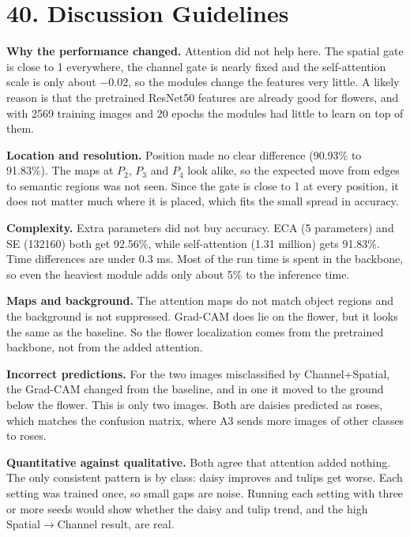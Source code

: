\documentclass[10pt]{article}
\begin{document}
\section*{40. Discussion Guidelines}

\textbf{Why the performance changed.} Attention did not help here. The spatial gate is close to 1 everywhere, the channel gate is nearly fixed and the self-attention scale is only about $-0.02$, so the modules change the features very little. A likely reason is that the pretrained ResNet50 features are already good for flowers, and with 2569 training images and 20 epochs the modules had little to learn on top of them.

\textbf{Location and resolution.} Position made no clear difference (90.93\% to 91.83\%). The maps at $P_2$, $P_3$ and $P_4$ look alike, so the expected move from edges to semantic regions was not seen. Since the gate is close to 1 at every position, it does not matter much where it is placed, which fits the small spread in accuracy.

\textbf{Complexity.} Extra parameters did not buy accuracy. ECA (5 parameters) and SE (132160) both get 92.56\%, while self-attention (1.31 million) gets 91.83\%. Time differences are under 0.3 ms. Most of the run time is spent in the backbone, so even the heaviest module adds only about 5\% to the inference time.

\textbf{Maps and background.} The attention maps do not match object regions and the background is not suppressed. Grad-CAM does lie on the flower, but it looks the same as the baseline. So the flower localization comes from the pretrained backbone, not from the added attention.

\textbf{Incorrect predictions.} For the two images misclassified by Channel+Spatial, the Grad-CAM changed from the baseline, and in one it moved to the ground below the flower. This is only two images. Both are daisies predicted as roses, which matches the confusion matrix, where A3 sends more images of other classes to roses.

\textbf{Quantitative against qualitative.} Both agree that attention added nothing. The only consistent pattern is by class: daisy improves and tulips get worse. Each setting was trained once, so small gaps are noise. Running each setting with three or more seeds would show whether the daisy and tulip trend, and the high Spatial$\rightarrow$Channel result, are real.
\end{document}
